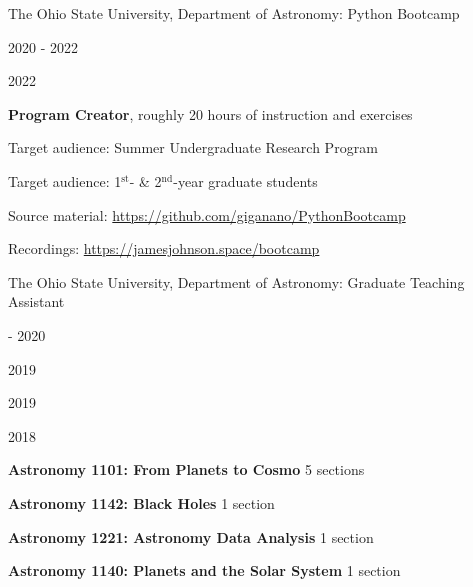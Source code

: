 \documentclass[cv.tex]{subfiles}
\begin{document}
{\color{themecolor} \large The Ohio State University, Department of Astronomy:
Python Bootcamp}
\par\noindent
\parbox{0.18\textwidth}{%
	\vspace{2mm}
	\raggedleft
	\null \par
	2020 - 2022 \par
	2022 \par
	\null \par
	\null
}
\hspace{1mm}
\parbox{0.73\textwidth}{%
	\textbf{Program Creator}, roughly 20 hours of instruction and exercises \par
	Target audience: Summer Undergraduate Research Program \par
	Target audience: 1$^\text{st}$- \& 2$^\text{nd}$-year graduate students \par
	Source material: 
	{\small \url{https://github.com/giganano/PythonBootcamp}} \par
	Recordings: {\small \url{https://jamesjohnson.space/bootcamp}}
}

\par\null\par\null\par\noindent
{\color{themecolor} \large The Ohio State University, Department of Astronomy:
Graduate Teaching Assistant}
\par\noindent
\parbox{0.18\textwidth}{%
	 - 2020 \par
	2019 \par
	2019 \par
	2018
}
\hspace{1mm}
\parbox{0.8\textwidth}{%
	\vspace{1mm}
	\textbf{Astronomy 1101: From Planets to Cosmo} \hfill 5 sections \par
	\textbf{Astronomy 1142: Black Holes} \hfill 1 section \par
	\textbf{Astronomy 1221: Astronomy Data Analysis} \hfill 1 section \par
	\textbf{Astronomy 1140: Planets and the Solar System} \hfill 1 section
}
\end{document}
